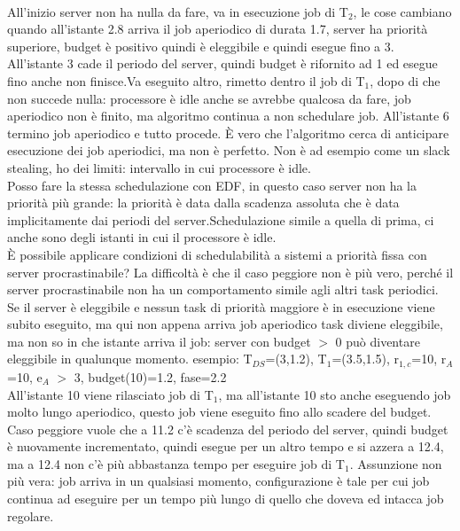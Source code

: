 \documentclass[12pt, oneside]{extbook}
\begin{document}
\\All'inizio server non ha nulla da fare, va in esecuzione job di T$_{2}$, le cose cambiano quando all'istante 2.8 arriva il job aperiodico di durata 1.7, server ha priorità superiore, budget è positivo quindi è eleggibile e quindi esegue fino a 3. All'istante 3 cade il periodo del server, quindi budget è rifornito ad 1 ed esegue fino anche non finisce.Va eseguito altro, rimetto dentro il job di T$_{1}$, dopo di che non succede nulla: processore è idle anche se avrebbe qualcosa da fare, job aperiodico non è finito, ma algoritmo continua a non schedulare job. All'istante 6 termino job aperiodico e tutto procede. È vero che l'algoritmo cerca di anticipare esecuzione dei job aperiodici, ma non è perfetto. Non è ad esempio come un slack stealing, ho dei limiti: intervallo in cui processore è idle.\\ Posso fare la stessa schedulazione con EDF, in questo caso server non ha la priorità più grande: la priorità è data dalla scadenza assoluta che è data implicitamente dai periodi del server.Schedulazione simile a quella di prima, ci anche sono degli istanti in cui il processore è idle.\\ È possibile applicare condizioni di schedulabilità a sistemi a priorità fissa con server procrastinabile? La difficoltà è che il caso peggiore non è più vero, perché il server procrastinabile non ha un comportamento simile agli altri task periodici. Se il server è eleggibile e nessun task di priorità maggiore è in esecuzione viene subito eseguito, ma qui non appena arriva job aperiodico task diviene eleggibile, ma non so in che istante arriva il job: server con budget $>$ 0 può diventare eleggibile in qualunque momento. esempio: T$_{DS}$=(3,1.2), T$_{1}$=(3.5,1.5), r$_{1,c}$=10, r$_{A}$=10, e$_{A}$ $>$ 3, budget(10)=1.2, fase=2.2\\ All'istante 10 viene rilasciato job di T$_{1}$, ma all'istante 10 sto anche eseguendo job molto lungo aperiodico, questo job viene eseguito fino allo scadere del budget. Caso peggiore vuole che a 11.2 c'è scadenza del periodo del server, quindi budget è nuovamente incrementato, quindi esegue per un altro tempo e si azzera a 12.4, ma a 12.4 non c'è più abbastanza tempo per eseguire job di T$_{1}$. Assunzione non più vera: job arriva in un qualsiasi momento, configurazione è tale per cui job continua ad eseguire per un tempo più lungo di quello che doveva ed intacca job regolare.
\end{document}

